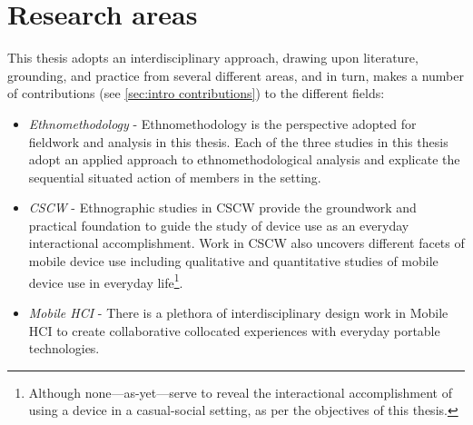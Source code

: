 \section{Research areas}\label{sec:intro areas}
This thesis adopts an interdisciplinary approach, drawing upon literature, grounding, and practice from several different areas, and in turn, makes a number of contributions (see \ref{sec:intro contributions}) to the different fields:

\begin{itemize}
\item \textit{Ethnomethodology} - Ethnomethodology is the perspective adopted for fieldwork and analysis in this thesis. 
Each of the three studies in this thesis adopt an applied approach to ethnomethodological analysis and explicate the sequential situated action of members in the setting.
\item \textit{\acf{CSCW}} - Ethnographic studies in \ac{CSCW} provide the groundwork and practical foundation to guide the study of device use as an everyday interactional accomplishment.
Work in \ac{CSCW} also uncovers different facets of mobile device use including qualitative and quantitative studies of mobile device use in everyday life\footnote{Although none---as-yet---serve to reveal the interactional accomplishment of using a device in a casual-social setting, as per the objectives of this thesis.}.
\item \textit{Mobile \acf{HCI}} - There is a plethora of interdisciplinary design work in Mobile \ac{HCI} to create collaborative collocated experiences with everyday portable technologies.
\end{itemize}






